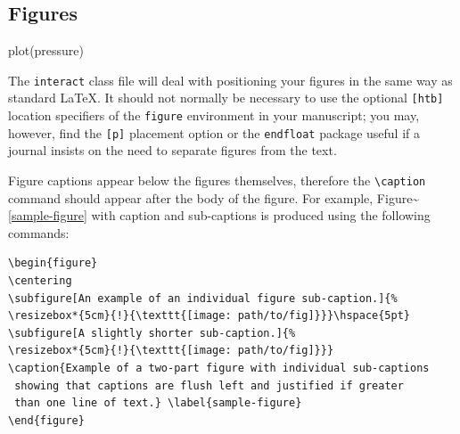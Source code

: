 \documentclass[]{interact}
\theoremstyle{plain}%
\theoremstyle{definition}
\theoremstyle{remark}
\newenvironment{Shaded}{\begin{snugshade}}{\end{snugshade}}
\newcommand{\FunctionTok}[1]{\textcolor[rgb]{0.00,0.00,0.00}{#1}}
\newcommand{\NormalTok}[1]{#1}
\begin{document}
\hypertarget{figures}{%
\subsection{Figures}\label{figures}}

\begin{Shaded}
\begin{Highlighting}[]
\FunctionTok{plot}\NormalTok{(pressure)}
\end{Highlighting}
\end{Shaded}

The \texttt{interact} class file will deal with positioning your figures
in the same way as standard \LaTeX. It should not normally be necessary
to use the optional \texttt{{[}htb{]}} location specifiers of the
\texttt{figure} environment in your manuscript; you may, however, find
the \texttt{{[}p{]}} placement option or the \texttt{endfloat} package
useful if a journal insists on the need to separate figures from the
text.

Figure captions appear below the figures themselves, therefore the
\texttt{\textbackslash{}caption} command should appear after the body of
the figure. For example, Figure\textasciitilde{}\ref{sample-figure} with
caption and sub-captions is produced using the following commands:

\begin{verbatim}
\begin{figure}
\centering
\subfigure[An example of an individual figure sub-caption.]{%
\resizebox*{5cm}{!}{\texttt{[image: path/to/fig]}}}\hspace{5pt}
\subfigure[A slightly shorter sub-caption.]{%
\resizebox*{5cm}{!}{\texttt{[image: path/to/fig]}}}
\caption{Example of a two-part figure with individual sub-captions
 showing that captions are flush left and justified if greater
 than one line of text.} \label{sample-figure}
\end{figure}
\end{verbatim}
\end{document}
